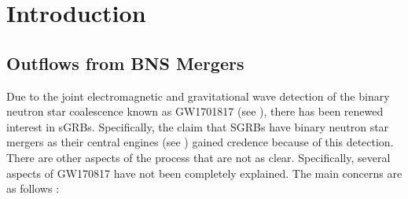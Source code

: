 \chapter{Introduction}\label{ch:introduction}

\section{Outflows from BNS Mergers}
    \label{sec:bns}
    Due to the joint electromagnetic and gravitational wave detection of the
    binary neutron star coalescence known as GW1701817 (see
    \cite{abbott_gw170817_2017}), there has been renewed interest in sGRBs.
    Specifically, the claim that SGRBs have binary neutron star mergers as
    their central engines  (see \cite{narayan_gamma-ray_1992}) gained
    credence because of this detection. There are other aspects of the
    process that are not as clear. Specifically, several aspects of GW170817
    have not been completely explained. The main concerns are as follows
    \cite{lazzati_short_2020}:

